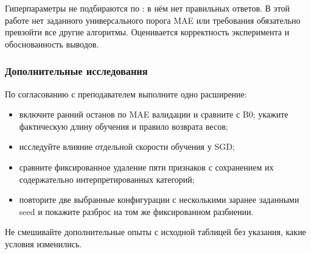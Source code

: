 Гиперпараметры не подбираются по : в нём нет правильных
ответов. В этой работе нет заданного универсального порога MAE или
требования обязательно превзойти все другие алгоритмы. Оценивается
корректность эксперимента и обоснованность выводов.

\subsubsection*{Дополнительные исследования}
По согласованию с преподавателем выполните одно расширение:
\begin{itemize}
\item включите ранний останов по MAE валидации и сравните с B0;
укажите фактическую длину обучения и правило возврата весов;
\item исследуйте влияние отдельной скорости обучения у SGD;
\item сравните фиксированное удаление пяти признаков с сохранением
их содержательно интерпретированных категорий;
\item повторите две выбранные конфигурации с несколькими заранее
заданными seed и покажите разброс на том же фиксированном разбиении.
\end{itemize}
Не смешивайте дополнительные опыты с исходной таблицей без указания,
какие условия изменились.

\clearpage
